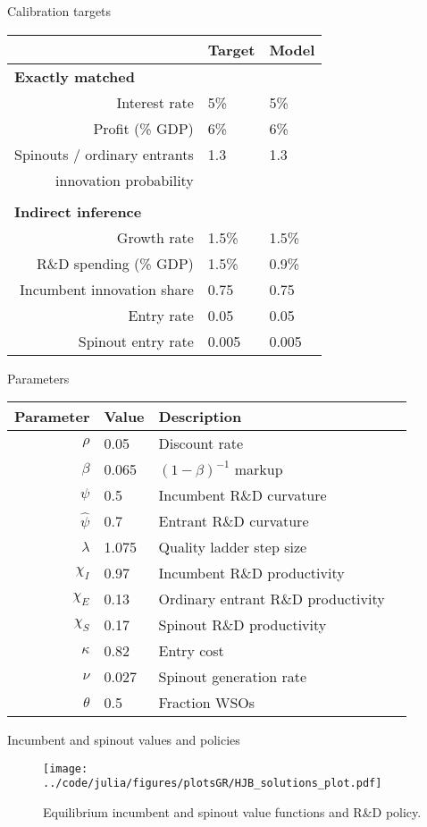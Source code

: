 \documentclass[english,usenames,dvipsnames]{beamer}
\begin{document}
\begin{frame}{Calibration targets}\label{calibration_targets}
\begin{table}
	\scriptsize
	\centering
	\begin{tabular}{rll}
		& Target & Model \tabularnewline
		\midrule
		\multicolumn{1}{l}{\textbf{Exactly matched}} & &  \tabularnewline
		Interest rate & 5\% & 5\% \tabularnewline
		Profit (\% GDP) & 6\% & 6\% \tabularnewline
		Spinouts / ordinary entrants & 1.3 & 1.3 \tabularnewline
		innovation probability \tabularnewline
		\tabularnewline
		\multicolumn{1}{l}{\textbf{Indirect inference}} & & 
		\tabularnewline
		Growth rate & 1.5\% & 1.5\% 
		\tabularnewline
		R\&D spending (\% GDP) & 1.5\% & 0.9\% 
		\tabularnewline		
		Incumbent innovation share & 0.75 & 0.75
		\tabularnewline
		Entry rate & 0.05 & 0.05
		\tabularnewline
		Spinout entry rate & 0.005 & 0.005
		\tabularnewline
		\bottomrule
	\end{tabular}
\end{table}

\end{frame}


\begin{frame}{Parameters}
\begin{table}
	\scriptsize
	\centering
	\begin{tabular}{rlll}
		Parameter & Value & Description \tabularnewline
		\midrule
		$\rho$ & 0.05 & Discount rate \tabularnewline
		$\beta$ & 0.065 & $(1-\beta)^{-1}$ markup\tabularnewline
		$\psi$ & 0.5 & Incumbent R\&D curvature \tabularnewline
		$\hat{\psi}$ & 0.7 & Entrant R\&D curvature \tabularnewline
		$\lambda$ & 1.075 & Quality ladder step size \tabularnewline
		$\chi_I$ & 0.97 & Incumbent R\&D productivity \tabularnewline
		$\chi_E$ & 0.13 & Ordinary entrant R\&D productivity \tabularnewline
		$\chi_S$ & 0.17 & Spinout R\&D productivity \tabularnewline
		$\kappa$ & 0.82  & Entry cost \tabularnewline
		$\nu$ & 0.027 & Spinout generation rate \tabularnewline
		$\theta$ & 0.5 & Fraction WSOs\tabularnewline
		\bottomrule
	\end{tabular}
\end{table}
\end{frame}


\begin{frame}{Incumbent and spinout values and policies}
\begin{figure}
	\centering
	\texttt{[image: ../code/julia/figures/plotsGR/HJB\_solutions\_plot.pdf]}
	\caption{Equilibrium incumbent and spinout value functions and R\&D policy.}
\end{figure}
\end{frame}
\end{document}
